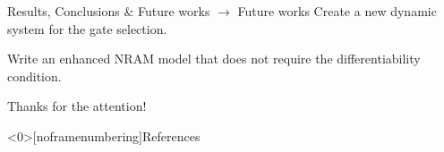 \documentclass[xcolor={usenames}]{beamer}
\begin{document}
  \begin{frame}{Results, Conclusions \& Future works \(\rightarrow\) Future works}
  	Create a new dynamic system for the gate selection.
  
	Write an enhanced NRAM model that does not require the differentiability condition.
  \end{frame}
  
  \begin{frame}[standout]
  	Thanks for the attention!
  	\thispagestyle{empty}
  \end{frame}
  \begin{frame}<0>[noframenumbering]{References}
        
  \end{frame}
\end{document}
